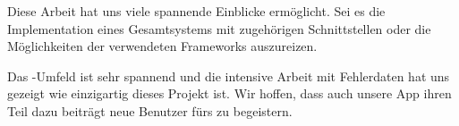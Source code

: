 Diese Arbeit hat uns viele spannende Einblicke ermöglicht.
Sei es die Implementation eines Gesamtsystems mit zugehörigen Schnittstellen oder die Möglichkeiten der verwendeten Frameworks auszureizen.

Das -Umfeld ist sehr spannend und die intensive Arbeit mit Fehlerdaten hat uns gezeigt wie einzigartig dieses Projekt ist.
Wir hoffen, dass auch unsere App ihren Teil dazu beiträgt neue Benutzer fürs  zu begeistern.